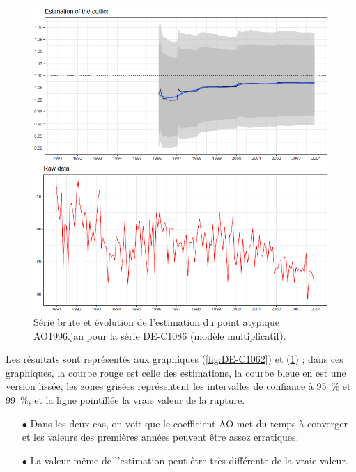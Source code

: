\documentclass[12pt, a4paper, french]{article}
\begin{document}
\begin{figure}[!ht]
\begin{center}
 \includegraphics[width=16cm]{img/DE-C1086-EstimateAO.PNG}
 \caption[Série brute et évolution de l'estimation du point atypique AO1996.jan pour la série DE-C1086 (modèle multiplicatif)]{Série brute et évolution de l'estimation du point atypique AO1996.jan pour la série DE-C1086 (modèle multiplicatif).}
 \label{fig:DE-C1086}
\end{center}
\end{figure}

Les résultats sont représentés aux graphiques (\ref{fig:DE-C1062}) et (\ref{fig:DE-C1086}) ; dans ces graphiques, la courbe rouge est celle des estimations, la courbe bleue en est une version lissée, les zones grisées représentent les intervalles de confiance à 95~\% et 99~\%, et la ligne pointillée la vraie valeur de la rupture.
\begin{itemize}
	\item[$\bullet$] Dans les deux cas, on voit que le coefficient AO met du temps à converger et les valeurs des premières années peuvent être assez erratiques.
	\item[$\bullet$] La valeur même de l'estimation peut être très différente de la vraie valeur.
\end{itemize}
\end{document}
